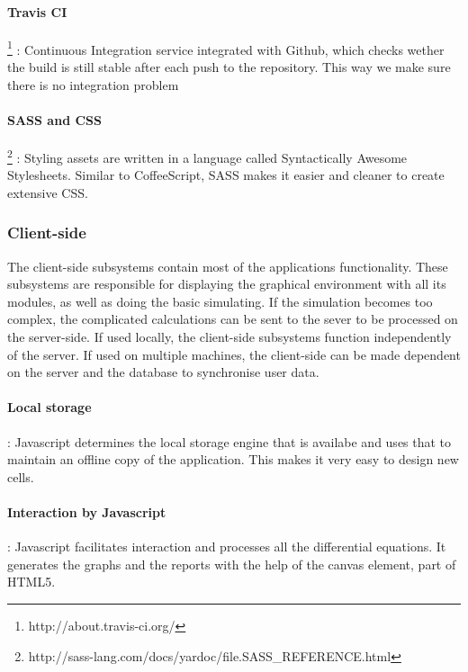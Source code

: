 \documentclass{report}
\begin{document}
				\paragraph{Travis CI} \footnote{http://about.travis-ci.org/}
					: Continuous Integration service integrated with Github, which checks wether the build is still stable after each push to the repository. This way we make sure there is no integration problem
				\paragraph{SASS and CSS} 
				\footnote{http://sass-lang.com/docs/yardoc/file.SASS\_REFERENCE.html}
					: Styling assets are written in a language called Syntactically Awesome Stylesheets. Similar to CoffeeScript, SASS makes it easier and cleaner to create extensive CSS. 
			\subsubsection{Client-side}
				The client-side subsystems contain most of the applications functionality. These subsystems are responsible for displaying the graphical environment with all its modules, as well as doing the basic simulating. If the simulation becomes too complex, the complicated calculations can be sent to the sever to be processed on the server-side. If used locally, the client-side subsystems function independently of the server. If used on multiple machines, the client-side can be made dependent on the server and the database to synchronise user data.
				\paragraph{Local storage}
					: Javascript determines the local storage engine that is availabe and uses that to maintain an offline copy of the application. This makes it very easy to design new cells. 
				\paragraph{Interaction by Javascript}
					: Javascript facilitates interaction and processes all the differential equations. It generates the graphs and the reports with the help of the canvas element, part of HTML5.
\end{document}

